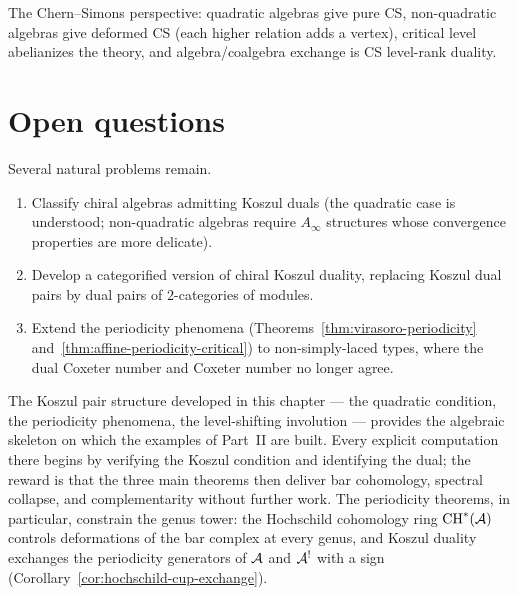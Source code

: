 The Chern--Simons perspective: quadratic algebras give pure CS, non-quadratic algebras give deformed CS (each higher relation adds a vertex), critical level abelianizes the theory, and algebra/coalgebra exchange is CS level-rank duality.

\section{Open questions}

Several natural problems remain.
\begin{enumerate}
\item Classify chiral algebras admitting Koszul duals (the quadratic
case is understood; non-quadratic algebras require $A_\infty$ structures
whose convergence properties are more delicate).
\item Develop a categorified version of chiral Koszul duality, replacing
Koszul dual pairs by dual pairs of $2$-categories of modules.
\item Extend the periodicity phenomena
(Theorems~\ref{thm:virasoro-periodicity}
and~\ref{thm:affine-periodicity-critical}) to non-simply-laced types,
where the dual Coxeter number and Coxeter number no longer agree.
\end{enumerate}

\medskip

The Koszul pair structure developed in this chapter --- the quadratic condition, the periodicity phenomena, the level-shifting involution --- provides the algebraic skeleton on which the examples of Part~II are built.  Every explicit computation there begins by verifying the Koszul condition and identifying the dual; the reward is that the three main theorems then deliver bar cohomology, spectral collapse, and complementarity without further work.  The periodicity theorems, in particular, constrain the genus tower: the Hochschild cohomology ring $\mathrm{CH}^*(\mathcal{A})$ controls deformations of the bar complex at every genus, and Koszul duality exchanges the periodicity generators of $\mathcal{A}$ and $\mathcal{A}^!$ with a sign (Corollary~\ref{cor:hochschild-cup-exchange}).
